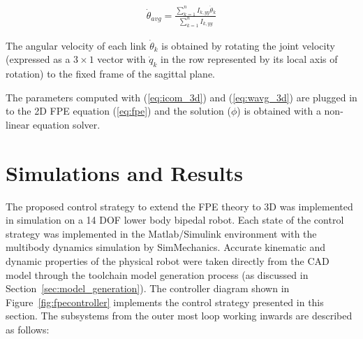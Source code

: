 \begin{equation}
	\begin{aligned}
		{\dot \theta _{avg}} = \frac{{\sum\limits_{k = 1}^n {{I_{k,yy}}} {{\dot \theta }_k}}}{{\sum\limits_{k = 1}^n {{I_{k,yy}}} }}
	\end{aligned}
	\label{eq:wavg_3d}
\end{equation}

The angular velocity of each link ${\dot{\theta}_k}$ is obtained by rotating the joint velocity (expressed as a $3\times1$ vector with $\dot{q}_k$ in the row represented by its local axis of rotation) to the fixed frame of the sagittal plane. 

The parameters computed with (\ref{eq:icom_3d}) and (\ref{eq:wavg_3d}) are plugged in to the 2D FPE equation (\ref{eq:fpe}) and the solution ($\phi$) is obtained with a non-linear equation solver. 


\section{Simulations and Results} %
\label{sec:simulations_and_results}

The proposed control strategy to extend the FPE theory to 3D was implemented in simulation on a 14 DOF lower body bipedal robot. Each state of the control strategy was implemented in the Matlab/Simulink environment with the multibody dynamics simulation by SimMechanics. Accurate kinematic and dynamic properties of the physical robot were taken directly from the CAD model through the toolchain model generation process (as discussed in Section~\ref{sec:model_generation}). The controller diagram shown in Figure~\ref{fig:fpecontroller} implements the control strategy presented in this section. The subsystems from the outer most loop working inwards are described as follows: 

